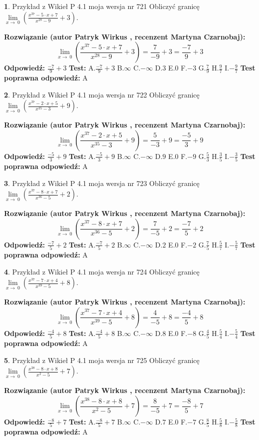 \documentclass[12pt, a4paper]{article}
\theoremstyle{definition} %
\newtheorem{zad}{}
\newcommand{\zadStart}[1]{\begin{zad}#1\newline}
\newcommand{\zadStop}{\end{zad}}
\newcommand{\rozwStart}[2]{\noindent \textbf{Rozwiązanie (autor #1 , recenzent #2): }\newline}
\newcommand{\rozwStop}{\newline}
\newcommand{\odpStart}{\noindent \textbf{Odpowiedź:}\newline}
\newcommand{\odpStop}{\newline}
\newcommand{\testStart}{\noindent \textbf{Test:}\newline}
\newcommand{\testStop}{\newline}
\newcommand{\kluczStart}{\noindent \textbf{Test poprawna odpowiedź:}\newline}
\newcommand{\kluczStop}{\newline}
\begin{document}
\zadStart{Przykład z Wikieł P 4.1 moja wersja nr 721}
Obliczyć granicę $\lim\limits_{x\to\ 0}(\frac{x^{37}-5 \cdot x +7}{x^{28}-9}+3)$.
\zadStop
\rozwStart{Patryk Wirkus}{Martyna Czarnobaj}
$$\lim\limits_{x\to\ 0}(\frac{x^{37}-5 \cdot x +7}{x^{28}-9}+3)=\frac{7}{-9}+3=\frac{-7}{9}+3$$
\rozwStop
\odpStart
$\frac{-7}{9}+3$
\odpStop
\testStart
A.$\frac{-7}{9}+3$
B.$\infty$
C.$-\infty$
D.$3$
E.$0$
F.$-3$
G.$\frac{7}{9}$
H.$\frac{9}{7}$
I.$-\frac{9}{7}$
\testStop
\kluczStart
A
\kluczStop



\zadStart{Przykład z Wikieł P 4.1 moja wersja nr 722}
Obliczyć granicę $\lim\limits_{x\to\ 0}(\frac{x^{37}-2 \cdot x +5}{x^{35}-3}+9)$.
\zadStop
\rozwStart{Patryk Wirkus}{Martyna Czarnobaj}
$$\lim\limits_{x\to\ 0}(\frac{x^{37}-2 \cdot x +5}{x^{35}-3}+9)=\frac{5}{-3}+9=\frac{-5}{3}+9$$
\rozwStop
\odpStart
$\frac{-5}{3}+9$
\odpStop
\testStart
A.$\frac{-5}{3}+9$
B.$\infty$
C.$-\infty$
D.$9$
E.$0$
F.$-9$
G.$\frac{5}{3}$
H.$\frac{3}{5}$
I.$-\frac{3}{5}$
\testStop
\kluczStart
A
\kluczStop



\zadStart{Przykład z Wikieł P 4.1 moja wersja nr 723}
Obliczyć granicę $\lim\limits_{x\to\ 0}(\frac{x^{37}-8 \cdot x +7}{x^{36}-5}+2)$.
\zadStop
\rozwStart{Patryk Wirkus}{Martyna Czarnobaj}
$$\lim\limits_{x\to\ 0}(\frac{x^{37}-8 \cdot x +7}{x^{36}-5}+2)=\frac{7}{-5}+2=\frac{-7}{5}+2$$
\rozwStop
\odpStart
$\frac{-7}{5}+2$
\odpStop
\testStart
A.$\frac{-7}{5}+2$
B.$\infty$
C.$-\infty$
D.$2$
E.$0$
F.$-2$
G.$\frac{7}{5}$
H.$\frac{5}{7}$
I.$-\frac{5}{7}$
\testStop
\kluczStart
A
\kluczStop



\zadStart{Przykład z Wikieł P 4.1 moja wersja nr 724}
Obliczyć granicę $\lim\limits_{x\to\ 0}(\frac{x^{37}-7 \cdot x +4}{x^{39}-5}+8)$.
\zadStop
\rozwStart{Patryk Wirkus}{Martyna Czarnobaj}
$$\lim\limits_{x\to\ 0}(\frac{x^{37}-7 \cdot x +4}{x^{39}-5}+8)=\frac{4}{-5}+8=\frac{-4}{5}+8$$
\rozwStop
\odpStart
$\frac{-4}{5}+8$
\odpStop
\testStart
A.$\frac{-4}{5}+8$
B.$\infty$
C.$-\infty$
D.$8$
E.$0$
F.$-8$
G.$\frac{4}{5}$
H.$\frac{5}{4}$
I.$-\frac{5}{4}$
\testStop
\kluczStart
A
\kluczStop



\zadStart{Przykład z Wikieł P 4.1 moja wersja nr 725}
Obliczyć granicę $\lim\limits_{x\to\ 0}(\frac{x^{38}-8 \cdot x +8}{x^{2}-5}+7)$.
\zadStop
\rozwStart{Patryk Wirkus}{Martyna Czarnobaj}
$$\lim\limits_{x\to\ 0}(\frac{x^{38}-8 \cdot x +8}{x^{2}-5}+7)=\frac{8}{-5}+7=\frac{-8}{5}+7$$
\rozwStop
\odpStart
$\frac{-8}{5}+7$
\odpStop
\testStart
A.$\frac{-8}{5}+7$
B.$\infty$
C.$-\infty$
D.$7$
E.$0$
F.$-7$
G.$\frac{8}{5}$
H.$\frac{5}{8}$
I.$-\frac{5}{8}$
\testStop
\kluczStart
A
\kluczStop
\end{document}
